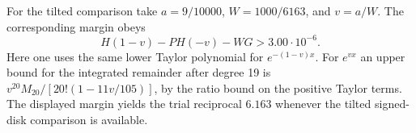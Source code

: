 For the tilted comparison take $a=9/10000$, $W=1000/6163$, and
$v=a/W$. The corresponding margin obeys
\[
 H(1-v)-PH(-v)-WG>3.00\cdot10^{-6}.
\]
Here one uses the same lower Taylor polynomial for $e^{-(1-v)x}$.
For $e^{vx}$ an upper bound for the integrated remainder after degree
19 is $v^{20}M_{20}/[20!(1-11v/105)]$, by the ratio bound on the
positive Taylor terms. The displayed margin yields the trial
reciprocal $6.163$ whenever the tilted signed-disk comparison is
available.

